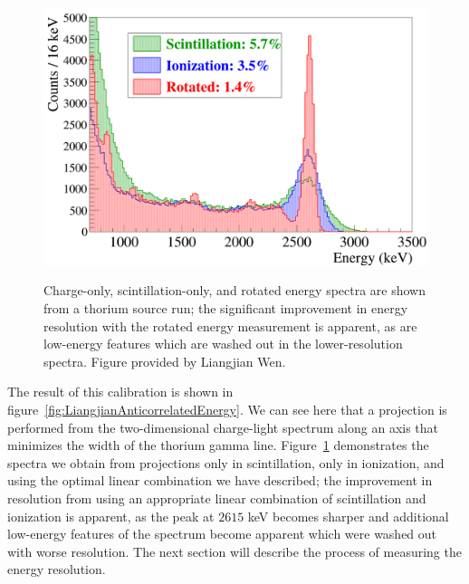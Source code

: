 \begin{figure}
\begin{center}
\includegraphics[keepaspectratio=true,width=\textwidth]{RotationTh2D_ImprovementInResolution.png}
\end{center}
\renewcommand{\baselinestretch}{1}
\small\normalsize
\begin{quote}
\caption{Charge-only, scintillation-only, and rotated energy spectra are shown from a thorium source run; the significant improvement in energy resolution with the rotated energy measurement is apparent, as are low-energy features which are washed out in the lower-resolution spectra.  Figure provided by Liangjian Wen.}
\label{fig:LiangjianRotatedSpectrumImprovement}
\end{quote}
\end{figure}
\renewcommand{\baselinestretch}{2}
\small\normalsize

The result of this calibration is shown in figure~\ref{fig:LiangjianAnticorrelatedEnergy}.  We can see here that a projection is performed from the two-dimensional charge-light spectrum along an axis that minimizes the width of the thorium gamma line.  Figure~\ref{fig:LiangjianRotatedSpectrumImprovement} demonstrates the spectra we obtain from projections only in scintillation, only in ionization, and using the optimal linear combination we have described; the improvement in resolution from using an appropriate linear combination of scintillation and ionization is apparent, as the peak at $2615$ keV becomes sharper and additional low-energy features of the spectrum become apparent which were washed out with worse resolution.  The next section will describe the process of measuring the energy resolution.

